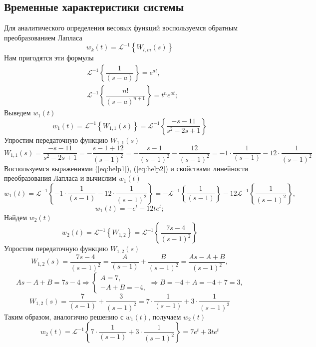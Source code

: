 \documentclass[a4paper, 12pt]{article}
\begin{document}
    \subsection{Временные характеристики системы}
    Для аналитического определения весовых функций воспользуемся
    обратным преобразованием Лапласа
    $$
    w_k(t)=\mathcal{L}^{-1}\left\{ W_{l,m}(s) \right\}
    $$
    Нам пригодятся эти формулы
    \begin{align}
        &\mathcal{L}^{-1}\left\{\dfrac{1}{\left( s-a \right)}\right\}=e^{at},\label{eq:help1} \\
        &\mathcal{L}^{-1}\left\{\dfrac{n!}{\left( s-a \right)^{n+1}}\right\}=t^ne^{at}; \label{eq:help2}
    \end{align}
    Выведем $w_1(t)$
    $$
    w_1(t)=\mathcal{L}^{-1}\left\{ W_{1,1}(s) \right\}=\mathcal{L}^{-1}\left\{ \dfrac{-s-11}{s^2-2s+1} \right\}
    $$
    Упростим передаточную функцию $W_{1,1}(s)$
    $$
    W_{1,1}(s)=\dfrac{-s-11}{s^2-2s+1}=-\dfrac{s-1+12}{\left( s-1 \right)^2}=-\dfrac{s-1}{\left( s-1 \right)^2}-\dfrac{12}{\left( s-1 \right)^2}=
    -1\cdot\dfrac{1}{\left(s-1\right)}-12\cdot\dfrac{1}{\left( s-1 \right)^2}
    $$
    Воспользуемся выражениями (\ref{eq:help1}), (\ref{eq:help2}) и свойствами линейности преобразования Лапласа и вычислим $w_1(t)$
    $$
    w_1(t)=\mathcal{L}^{-1}\left\{ -1\cdot\dfrac{1}{\left(s-1\right)}-12\cdot\dfrac{1}{\left( s-1 \right)^2} \right\}=
    -\mathcal{L}^{-1}\left\{ \dfrac{1}{\left(s-1\right)} \right\}-12\mathcal{L}^{-1}\left\{ \dfrac{1}{\left( s-1 \right)^2} \right\},
    $$
    $$
    w_1(t)=-e^t-12te^t;
    $$
    Найдем $w_2(t)$
    $$
    w_2(t)=\mathcal{L}^{-1}\left\{ W_{1,2} \right\}=\mathcal{L}^{-1}\left\{ \dfrac{7s-4}{\left( s-1 \right)^2} \right\}
    $$
    Упростим передаточную функцию $W_{1,2}(s)$
    $$
    W_{1,2}(s)=\dfrac{7s-4}{\left( s-1 \right)^2}=\dfrac{A}{\left(s-1\right)}+\dfrac{B}{\left( s-1 \right)^2}=\dfrac{As-A+B}{\left( s-1 \right)^2},
    $$
    $$
    As-A+B=7s-4\Rightarrow \begin{cases}
        A=7,\\
        -A+B=-4,
    \end{cases}\Rightarrow B=-4+A=-4+7=3,
    $$
    $$
    W_{1,2}(s)=\dfrac{7}{\left( s-1 \right)}+\dfrac{3}{\left( s-1 \right)^2}=7\cdot\dfrac{1}{\left( s-1 \right)}+3\cdot\dfrac{1}{\left( s-1 \right)^2}
    $$
    Таким образом, аналогично решению с $w_1(t)$, получаем $w_2(t)$
    $$
    w_2(t)=\mathcal{L}^{-1}\left\{ 7\cdot\dfrac{1}{\left( s-1 \right)}+3\cdot\dfrac{1}{\left( s-1 \right)^2} \right\}=7e^t+3te^t
    $$
\end{document}
